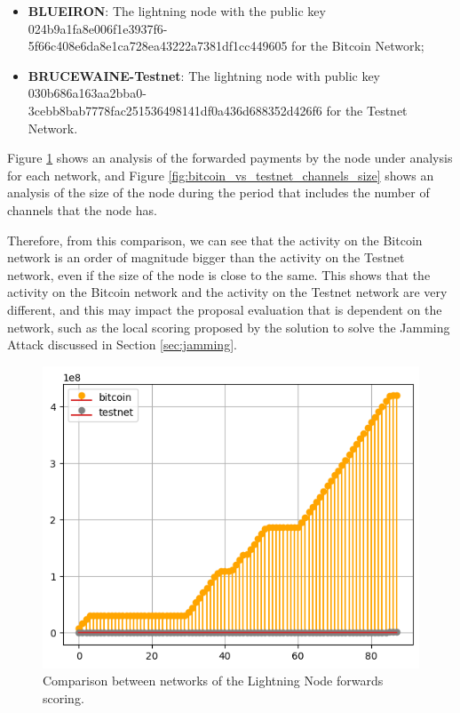 \begin{itemize}
    \item {\bf BLUEIRON}: The lightning node with the public key 024b9a1fa8e006f1e3937f6-\\5f66c408e6da8e1ca728ea43222a7381df1cc449605 for the Bitcoin Network;
    \item {\bf BRUCEWAINE-Testnet}: The lightning node with public key 030b686a163aa2bba0-\\3cebb8bab7778fac251536498141df0a436d688352d426f6 for the Testnet Network.
\end{itemize}

Figure \ref{fig:bitcoin_vs_testnet_forwards} shows an analysis of the forwarded 
payments by the node under analysis for each network, and Figure \ref{fig:bitcoin_vs_testnet_channels_size} 
shows an analysis of the size of the node during the period that includes the number
of channels that the node has.

Therefore, from this comparison, we can see that the activity on the Bitcoin network is an order of magnitude
bigger than the activity on the Testnet network, even if the size of the node is close to the same. This 
shows that the activity on the Bitcoin network and the activity on the Testnet network are very different,
and this may impact the proposal evaluation that is dependent on the network, such as the local scoring 
proposed by the solution to solve the Jamming Attack discussed in Section \ref{sec:jamming}.

\begin{figure}[H]
    \begin{center}
        \includegraphics[scale=0.7]{imgs/bitcoin_vs_testnet_forwards.png}
    \end{center}
    \caption{Comparison between networks of the Lightning Node forwards scoring.}
    \label{fig:bitcoin_vs_testnet_forwards}
\end{figure}

